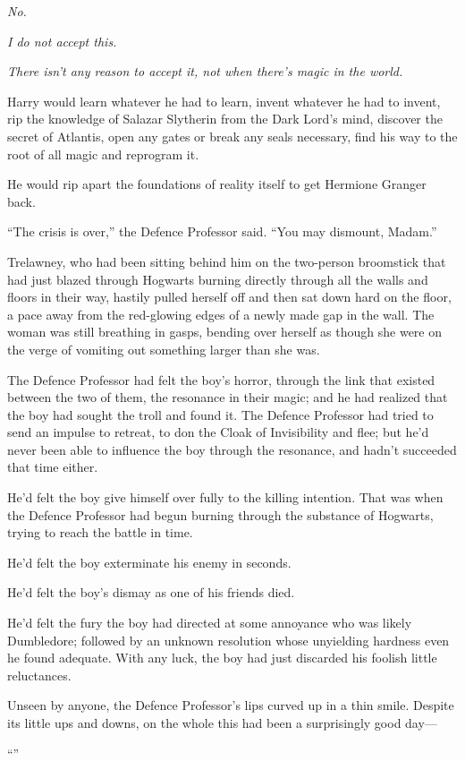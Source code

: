 \emph{No.}

\emph{I do not accept this.}

\emph{There isn’t any reason to accept it, not when there’s magic in the world.}

Harry would learn whatever he had to learn, invent whatever he had to invent, rip the knowledge of Salazar Slytherin from the Dark Lord’s mind, discover the secret of Atlantis, open any gates or break any seals necessary, find his way to the root of all magic and reprogram it.

He would rip apart the foundations of reality itself to get Hermione Granger back.

\later

“The crisis is over,” the Defence Professor said. “You may dismount, Madam.”

Trelawney, who had been sitting behind him on the two-person broomstick that had just blazed through Hogwarts burning directly through all the walls and floors in their way, hastily pulled herself off and then sat down hard on the floor, a pace away from the red-glowing edges of a newly made gap in the wall. The woman was still breathing in gasps, bending over herself as though she were on the verge of vomiting out something larger than she was.

The Defence Professor had felt the boy’s horror, through the link that existed between the two of them, the resonance in their magic; and he had realized that the boy had sought the troll and found it. The Defence Professor had tried to send an impulse to retreat, to don the Cloak of Invisibility and flee; but he’d never been able to influence the boy through the resonance, and hadn’t succeeded that time either.

He’d felt the boy give himself over fully to the killing intention. That was when the Defence Professor had begun burning through the substance of Hogwarts, trying to reach the battle in time.

He’d felt the boy exterminate his enemy in seconds.

He’d felt the boy’s dismay as one of his friends died.

He’d felt the fury the boy had directed at some annoyance who was likely Dumbledore; followed by an unknown resolution whose unyielding hardness even he found adequate. With any luck, the boy had just discarded his foolish little reluctances.

Unseen by anyone, the Defence Professor’s lips curved up in a thin smile. Despite its little ups and downs, on the whole this had been a surprisingly good day—

“”
